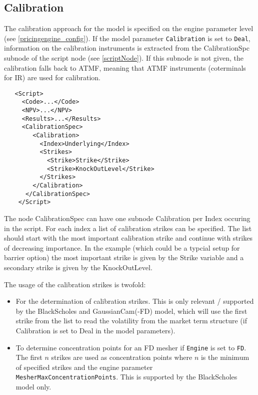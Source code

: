 \subsection{Calibration}\label{calibration}

The calibration approach for the model is specified on the engine parameter level (see \ref{pricingengine_config}). If
the model parameter \verb+Calibration+ is set to \verb+Deal+, information on the calibration instruments is extracted
from the CalibrationSpc subnode of the script node (see \ref{scriptNode}). If this subnode is not given, the calibration
falls back to ATMF, meaning that ATMF instruments (coterminals for IR) are used for calibration.

\begin{verbatim}
   <Script>
     <Code>...</Code>
     <NPV>...</NPV>
     <Results>...</Results>
     <CalibrationSpec>
        <Calibration>
          <Index>Underlying</Index>
          <Strikes>
            <Strike>Strike</Strike>
            <Strike>KnockOutLevel</Strike>
          </Strikes>
        </Calibration>
      </CalibrationSpec>
    </Script>
\end{verbatim}

The node CalibrationSpec can have one subnode Calibration per Index occuring in the script. For each index a list of
calibration strikes can be specified. The list should start with the most important calibration strike and continue with
strikes of decreasing importance. In the example (which could be a typcial setup for barrier option) the most important
strike is given by the Strike variable and a secondary strike is given by the KnockOutLevel.

The usage of the calibration strikes is twofold:

\begin{itemize}
\item For the determination of calibration strikes. This is only relevant / supported by the BlackScholes and
  GaussianCam(-FD) model, which will use the first strike from the list to read the volatility from the market term
  structure (if Calibration is set to Deal in the model parameters).
\item To determine concentration points for an FD mesher if \verb+Engine+ is set to \verb+FD+. The first $n$ strikes are
  used as concentration points where $n$ is the minimum of specified strikes and the engine parameter
  \verb+MesherMaxConcentrationPoints+. This is supported by the BlackScholes model only.
\end{itemize}

